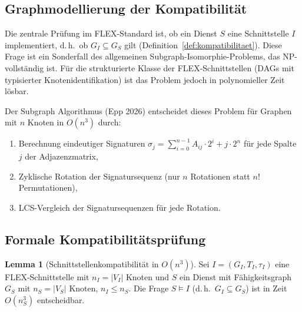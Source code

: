 ﻿\documentclass[a4paper,12pt]{article}
\theoremstyle{definition}
\newtheorem{lemma}{Lemma}
\begin{document}
\subsection{Graphmodellierung der Kompatibilität}

Die zentrale Prüfung im FLEX-Standard ist, ob ein Dienst $S$ eine Schnittstelle $I$ implementiert, d.\,h.\ ob $G_I \subseteq G_S$ gilt (Definition~\ref{def:kompatibilitaet}). Diese Frage ist ein Sonderfall des allgemeinen Subgraph-Isomorphie-Problems, das NP-vollständig ist. Für die strukturierte Klasse der FLEX-Schnittstellen (DAGs mit typisierter Knotenidentifikation) ist das Problem jedoch in polynomieller Zeit lösbar.

Der Subgraph Algorithmus (Epp 2026) \cite{epp2026} entscheidet dieses Problem für Graphen mit $n$ Knoten in $O(n^3)$ durch:

\begin{enumerate}
    \item Berechnung eindeutiger Signaturen $\sigma_j = \sum_{i=0}^{n-1} A_{ij} \cdot 2^i + j \cdot 2^n$ für jede Spalte $j$ der Adjazenzmatrix,
    \item Zyklische Rotation der Signatursequenz (nur $n$ Rotationen statt $n!$ Permutationen),
    \item LCS-Vergleich der Signatursequenzen für jede Rotation.
\end{enumerate}

\subsection{Formale Kompatibilitätsprüfung}

\begin{lemma}[Schnittstellenkompatibilität in $O(n^3)$]
\label{lem:kompatibilitaet}
Sei $I = (G_I, T_I, \tau_I)$ eine FLEX-Schnittstelle mit $n_I = |V_I|$ Knoten und $S$ ein Dienst mit Fähigkeitsgraph $G_S$ mit $n_S = |V_S|$ Knoten, $n_I \leq n_S$. Die Frage $S \models I$ (d.\,h.\ $G_I \subseteq G_S$) ist in Zeit $O(n_S^3)$ entscheidbar.
\end{lemma}
\end{document}
